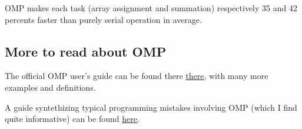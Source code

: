 OMP makes each task (array assignment and summation) respectively 35 and 42 percents faster than purely serial operation in average.

\subsection{More to read about OMP}
The official OMP user's guide can be found there \href{http://www.openmp.org/wp-content/uploads/OpenMP4.0.0.Examples.pdf}{there}, with many more examples and definitions.

A guide syntethizing typical programming mistakes involving OMP (which I find quite informative) can be found \href{https://software.intel.com/en-us/articles/32-openmp-traps-for-c-developers}{here}.